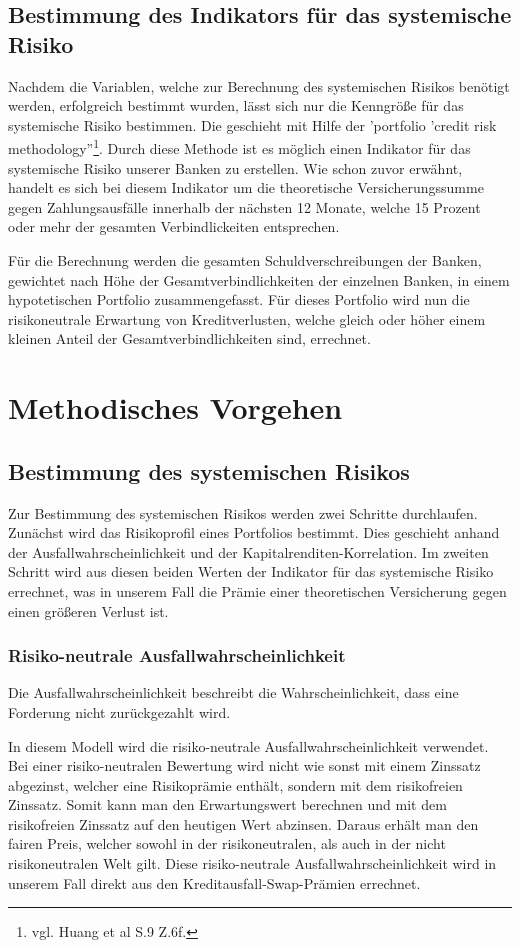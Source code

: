 \documentclass[a4paper,12pt]{scrartcl}
\begin{document}
\subsection{Bestimmung des Indikators für das systemische Risiko}
Nachdem die Variablen, welche zur Berechnung des systemischen Risikos benötigt werden, erfolgreich bestimmt wurden, lässt sich nur die Kenngröße für das systemische Risiko bestimmen. Die geschieht mit Hilfe der 'portfolio 'credit risk methodology''\footnote{vgl. Huang et al S.9 Z.6f.}. Durch diese Methode ist es möglich einen Indikator für das systemische Risiko unserer Banken zu erstellen. Wie schon zuvor erwähnt, handelt es sich bei diesem Indikator um die theoretische Versicherungssumme gegen Zahlungsausfälle innerhalb der nächsten 12 Monate, welche 15 Prozent oder mehr der gesamten Verbindlickeiten entsprechen.

Für die Berechnung werden die gesamten Schuldverschreibungen der Banken, gewichtet nach Höhe der Gesamtverbindlichkeiten der einzelnen Banken, in einem hypotetischen Portfolio zusammengefasst. Für dieses Portfolio wird nun die risikoneutrale Erwartung von Kreditverlusten, welche gleich oder höher einem kleinen Anteil der Gesamtverbindlichkeiten sind, errechnet.



\section{Methodisches Vorgehen}
\subsection{Bestimmung des systemischen Risikos}
Zur Bestimmung des systemischen Risikos werden zwei Schritte durchlaufen. Zunächst wird das Risikoprofil eines Portfolios bestimmt. Dies geschieht anhand der Ausfallwahrscheinlichkeit und der Kapitalrenditen-Korrelation.
Im zweiten Schritt wird aus diesen beiden Werten der Indikator für das systemische Risiko errechnet, was in unserem Fall die Prämie einer theoretischen Versicherung gegen einen größeren Verlust ist.
\subsubsection{Risiko-neutrale Ausfallwahrscheinlichkeit}
Die Ausfallwahrscheinlichkeit beschreibt die Wahrscheinlichkeit, dass eine Forderung nicht zurückgezahlt wird.

In diesem Modell wird die risiko-neutrale Ausfallwahrscheinlichkeit verwendet. Bei einer risiko-neutralen Bewertung wird nicht wie sonst mit einem Zinssatz abgezinst, welcher eine Risikoprämie enthält, sondern mit dem risikofreien Zinssatz. Somit kann man den Erwartungswert berechnen und mit dem risikofreien Zinssatz auf den heutigen Wert abzinsen. Daraus erhält man den fairen Preis, welcher sowohl in der risikoneutralen, als auch in der nicht risikoneutralen Welt gilt.
Diese risiko-neutrale Ausfallwahrscheinlichkeit wird in unserem Fall direkt aus den Kreditausfall-Swap-Prämien errechnet. 
\end{document}

